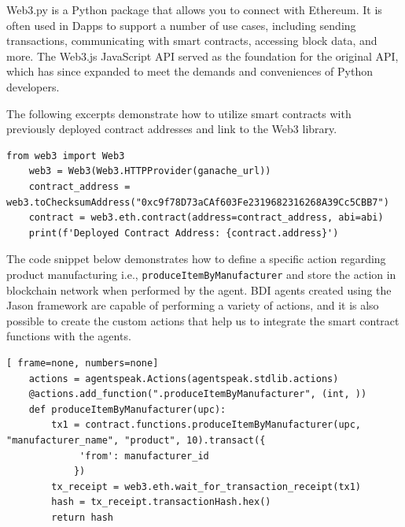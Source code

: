 Web3.py is a Python package that allows you to connect with Ethereum. It is often used in \ac{Dapp}s to support a number of use cases, including sending transactions, communicating with smart contracts, accessing block data, and more. The Web3.js JavaScript \ac{API} served as the foundation for the original \ac{API}, which has since expanded to meet the demands and conveniences of Python developers.

\vspace{.5cm}

The following excerpts demonstrate how to utilize smart contracts with previously deployed contract addresses and link to the Web3 library.

\vspace{.5cm}

\begin{lstlisting}[frame=none, numbers=none]
    from web3 import Web3
    web3 = Web3(Web3.HTTPProvider(ganache_url))
    contract_address = web3.toChecksumAddress("0xc9f78D73aCAf603Fe2319682316268A39Cc5CBB7")
    contract = web3.eth.contract(address=contract_address, abi=abi)
    print(f'Deployed Contract Address: {contract.address}')
\end{lstlisting}

\vspace{.5cm}

The code snippet below demonstrates how to define a specific action regarding product manufacturing i.e., \texttt{produceItemByManufacturer} and store the action in blockchain network when performed by the agent. \ac{BDI} agents created using the Jason framework are capable of performing a variety of actions, and it is also possible to create the custom actions that help us to integrate the smart contract functions with the agents.

\vspace{.5cm}

\begin{lstlisting}[ frame=none, numbers=none]
    actions = agentspeak.Actions(agentspeak.stdlib.actions)
    @actions.add_function(".produceItemByManufacturer", (int, ))
    def produceItemByManufacturer(upc): 
        tx1 = contract.functions.produceItemByManufacturer(upc, "manufacturer_name", "product", 10).transact({
             'from': manufacturer_id
            })
        tx_receipt = web3.eth.wait_for_transaction_receipt(tx1)
        hash = tx_receipt.transactionHash.hex()
        return hash
\end{lstlisting}


